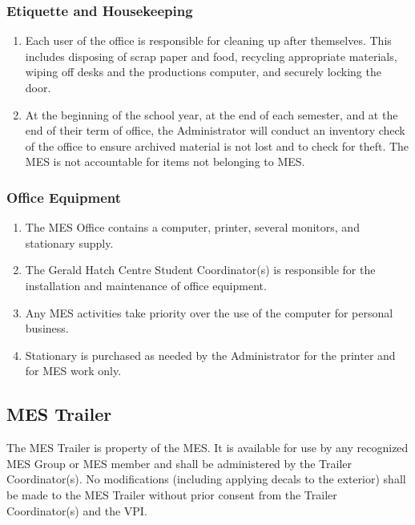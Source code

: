 \subsubsection{Etiquette and Housekeeping}
\label{etiquette-and-housekeeping}
\begin{enumerate}
 \item
  Each user of the office is responsible for cleaning up after themselves. This includes disposing of scrap paper and food, recycling appropriate materials, wiping off desks and the productions computer, and securely locking the door.
 \item
  At the beginning of the school year, at the end of each semester, and at the end of their term of office, the Administrator will conduct an inventory check of the office to ensure archived material is not lost and to check for theft. The MES is not accountable for items not belonging to MES.

\end{enumerate}

\subsubsection{Office Equipment}
\label{office-equipment}
\begin{enumerate}
 \item
  The MES Office contains a computer, printer, several monitors, and stationary supply.
 \item
  The Gerald Hatch Centre Student Coordinator(s) is responsible for the installation and maintenance of office equipment.
 \item
  Any MES activities take priority over the use of the computer for personal business.
 \item
  Stationary is purchased as needed by the Administrator for the printer and for MES work only.

\end{enumerate}

\subsection{MES Trailer}
\label{mes-trailer}
The MES Trailer is property of the MES. It is available for use by any
recognized MES Group or MES member and shall be administered by the
Trailer Coordinator(s). No modifications (including applying decals to
the exterior) shall be made to the MES Trailer without prior consent
from the Trailer Coordinator(s) and the VPI.

